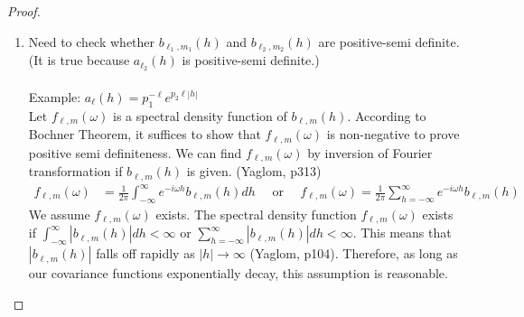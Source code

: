 \documentclass[11pt]{article}
\begin{document}
\begin{itemize}
\begin{proof}
\begin{enumerate}
(ii) For $B_2$,\\
WTS:\\
\begin{align*}
&|b_{\ell_1,m_1}^{\ell_1',m_1'}(h)| \le \{b_{\ell_1,m_1}(0) b_{\ell_1',m_1'}(0)\}^\frac{1}{2}\\
&\Rightarrow \biggl| \sum_{\ell_2'=\kappa}^{\infty} \sum_{m_2'=-\ell_2'}^{\ell_2'} a_{\ell_2}(h) Y_{\ell_2'}^{m_2'}(\tau_{\ell_1,m_1}) Y_{\ell_2'}^{m_2'}(\tau_{\ell_1',m_1'}) \biggl|\\
&\le \Biggl[ \biggl\{ \sum_{\ell_2'=\kappa}^{\infty} \sum_{m_2'=-\ell_2'}^{\ell_2'} a_{\ell_2}(0) Y_{\ell_2'}^{m_2'}(\tau_{\ell_1,m_1}) Y_{\ell_2'}^{m_2'}(\tau_{\ell_1,m_1}) \biggl\} \biggl\{ \sum_{\ell_2'=\kappa}^{\infty} \sum_{m_2'=-\ell_2'}^{\ell_2'} a_{\ell_2}(0) Y_{\ell_2'}^{m_2'}(\tau_{\ell_1',m_1'}) Y_{\ell_2'}^{m_2'}(\tau_{\ell_1',m_1'}) \biggl\} \Biggl]^\frac{1}{2}\\
&\text{by addition theorem, }\\
&\biggl\{ \sum_{\ell_2=\kappa}^{\infty} \frac{2\ell_2 + 1}{4\pi} a_{\ell_2}(h) P_{\ell_2}(\cos{\overrightarrow{\tau_{\ell_1,m_1} \tau_{\ell_1',m_1'}}}\biggl\}^2 \le \biggl\{ \sum_{\ell_2=\kappa}^{\infty} \frac{2\ell_2 + 1}{4\pi} a_{\ell_2}(h) \biggl\}^2\\
\end{align*}
This is true since $|P_{\ell_2}(\cdot)| \le 1$ and $a_{\ell_2}(h) \le a_{\ell_2}(0)$.\\

\item
Need to check whether $b_{\ell_1,m_1}(h)$ and $b_{\ell_2,m_2}(h)$ are positive-semi definite.\\ 
(It is true because $a_{\ell_2}(h)$ is positive-semi definite.)\\
\\
Example: $a_{\ell}(h) = p_1^{-\ell} e^{p_2 \ell |h|}$\\
Let $f_{\ell,m}(\omega)$ is a spectral density function of $b_{\ell,m}(h)$. According to Bochner Theorem, it suffices to show that $f_{\ell,m}(\omega)$ is non-negative to prove positive semi definiteness. We can find $f_{\ell,m}(\omega)$ by inversion of Fourier transformation if $b_{\ell,m}(h)$ is given. (Yaglom, p313)\\
\begin{align*}
f_{\ell,m}(\omega) &=  \frac{1}{2\pi} \int_{-\infty}^\infty e^{-i\omega h} b_{\ell,m}(h) dh \quad \text{ or } \quad f_{\ell,m}(\omega) =  \frac{1}{2\pi} \sum_{h=-\infty}^\infty e^{-i\omega h} b_{\ell,m}(h) 
\end{align*}
We assume  $f_{\ell,m}(\omega)$ exists. The spectral density function $f_{\ell,m}(\omega)$ exists if $\int_{-\infty}^\infty |b_{\ell,m}(h)|dh < \infty$ or $\sum_{h=-\infty}^\infty |b_{\ell,m}(h)|dh < \infty$. This means that $|b_{\ell,m}(h)|$ falls off rapidly as $|h| \rightarrow \infty$ (Yaglom, p104). Therefore, as long as our covariance functions exponentially decay, this assumption is reasonable.\\


\end{enumerate}
\end{proof}
\end{itemize}
\end{document}
